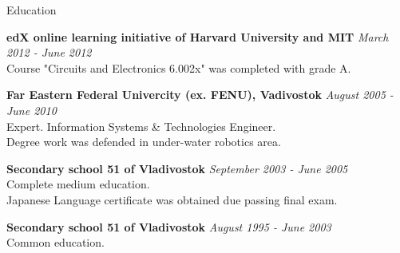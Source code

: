 \documentclass{resume}
\begin{document}

\begin{rSection}{Education}

{\bf edX online learning initiative of Harvard University and MIT} \hfill {\em March 2012 - June 2012} \\
Course "Circuits and Electronics 6.002x" was completed with grade A.

{\bf Far Eastern Federal Univercity (ex. FENU), Vadivostok} \hfill {\em August 2005 - June 2010} \\ 
Expert. Information Systems \& Technologies Engineer. \\
Degree work was defended in under-water robotics area.

{\bf Secondary school 51 of Vladivostok} \hfill {\em September 2003  - June 2005} \\
Complete medium education. \\
Japanese Language certificate was obtained due passing final exam.

{\bf Secondary school 51 of Vladivostok} \hfill {\em August 1995 - June 2003} \\
Common education.

\end{rSection}

\end{document}
